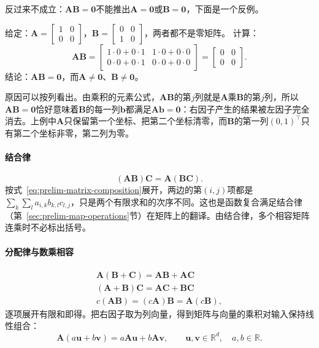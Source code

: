 反过来不成立：$\bm A\bm B=\bm0$不能推出$\bm A=\bm0$或$\bm B=\bm0$，下面是一个反例。
\begin{example}[反例：两个非零矩阵的乘积为零]
\label{ex:ls-zero-product-nonzero-factors}
给定：$\bm A=\left[\begin{smallmatrix}1&0\\0&0\end{smallmatrix}\right]$，$\bm B=\left[\begin{smallmatrix}0&0\\1&0\end{smallmatrix}\right]$，两者都不是零矩阵。
计算：
\[
 \bm A\bm B=\begin{bmatrix}1\cdot0+0\cdot1&1\cdot0+0\cdot0\\0\cdot0+0\cdot1&0\cdot0+0\cdot0\end{bmatrix}=\begin{bmatrix}0&0\\0&0\end{bmatrix}.
\]
结论：$\bm A\bm B=\bm0$，而$\bm A\neq\bm0$、$\bm B\neq\bm0$。
\end{example}
原因可以按列看出。由乘积的元素公式，$\bm A\bm B$的第$j$列就是$\bm A$乘$\bm B$的第$j$列，所以$\bm A\bm B=\bm0$恰好意味着$\bm B$的每一列$\bm b$都满足$\bm A\bm b=\bm0$：右因子产生的结果被左因子完全消去。上例中$\bm A$只保留第一个坐标、把第二个坐标清零，而$\bm B$的第一列$(0,1)^\top$只有第二个坐标非零，第二列为零。

\paragraph{结合律}
\[
 (\bm A\bm B)\bm C=\bm A(\bm B\bm C).
\]
按式~\eqref{eq:prelim-matrix-composition}展开，两边的第$(i,j)$项都是$\sum_k\sum_l a_{i,k}b_{k,l}c_{l,j}$，只是两个有限求和的次序不同。这也是函数复合满足结合律（第~\ref{sec:prelim-map-operations}节）在矩阵上的翻译。由结合律，多个相容矩阵连乘时不必标出括号。

\paragraph{分配律与数乘相容}
\[
 \begin{gathered}
\bm A(\bm B+\bm C)=\bm A\bm B+\bm A\bm C\\
(\bm A+\bm B)\bm C=\bm A\bm C+\bm B\bm C\\
c(\bm A\bm B)=(c\bm A)\bm B=\bm A(c\bm B),
 \end{gathered}
\]
逐项展开有限和即得。把右因子取为列向量，得到矩阵与向量的乘积对输入保持线性组合：
\begin{equation}
\bm A(a\bm u+b\bm v)=a\bm A\bm u+b\bm A\bm v,\qquad
\bm u,\bm v\in\mathbb R^d,\quad a,b\in\mathbb R.
\label{eq:prelim-matrix-linearity}
\end{equation}

